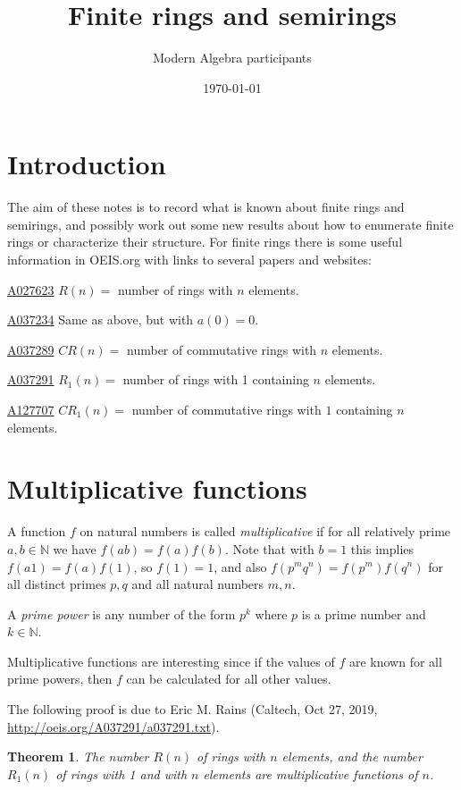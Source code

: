 \documentclass{amsart}
\title{Finite rings and semirings}
\author{Modern Algebra participants }
\date{\today}
\newtheorem{theorem}{Theorem}
\begin{document}
\maketitle

\section{Introduction}
The aim of these notes is to record what is known about finite rings and semirings, and possibly work out some new results about how to enumerate finite rings or characterize their structure.
For finite rings there is some useful information in OEIS.org with links to several papers and websites:

\href{http://oeis.org/A027623}{A027623} $R(n)=$ number of rings with $n$ elements.

\href{http://oeis.org/A037234}{A037234}  Same as above, but with $a(0) = 0$.

\href{http://oeis.org/A037289}{A037289} $CR(n)=$ number of commutative rings with $n$ elements. 

\href{http://oeis.org/A037291}{A037291} $R_1(n)=$ number of rings with 1 containing $n$ elements. 

\href{http://oeis.org/A127707}{A127707} $CR_1(n)=$ number of commutative rings with $1$ containing $n$ elements. 

\section{Multiplicative functions}

A function $f$ on natural numbers is called \textit{multiplicative} if for all relatively prime $a,b\in\mathbb N$  we have $f(ab)=f(a)f(b)$. Note that with $b=1$ this implies $f(a1)=f(a)f(1)$, so $f(1)=1$, and also $f(p^mq^n)=f(p^m)f(q^n)$ for all distinct primes $p,q$ and all natural numbers $m,n$.

A \textit{prime power} is any number of the form $p^k$ where $p$ is a prime number and $k\in\mathbb N$.

Multiplicative functions are interesting since if  the values of $f$ are known for all prime powers, then $f$ can be calculated for all other values.

The following proof is due to Eric M. Rains (Caltech, Oct 27, 2019, \url{http://oeis.org/A037291/a037291.txt}).

\begin{theorem}
The number $R(n)$ of rings with $n$ elements, and the number $R_1(n)$ of rings with 1 and with $n$ elements are multiplicative functions of $n$.
\end{theorem}
\end{document}
